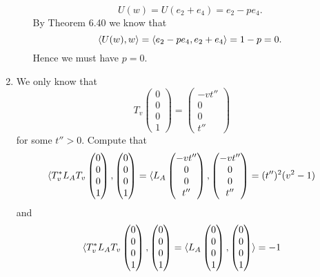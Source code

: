 \begin{enumerate}
\begin{enumerate}
\[U(w)=U(e_2+e_4)=e_2-pe_4.\]
By Theorem 6.40 we know that 
\[\langle U(w),w\rangle =\langle e_2-pe_4,e_2+e_4\rangle =1-p=0.\]
Hence we must have $p=0$.
\end{enumerate}
\item We only know that 
\[T_v\begin{pmatrix}0\\0\\0\\1\end{pmatrix}=\begin{pmatrix}-vt''\\0\\0\\t''\end{pmatrix}\]
for some $t''>0$. Compute that 
\[\langle T_v^*L_AT_v\begin{pmatrix}0\\0\\0\\1\end{pmatrix},\begin{pmatrix}0\\0\\0\\1\end{pmatrix} = \langle L_A\begin{pmatrix}-vt''\\0\\0\\t''\end{pmatrix},\begin{pmatrix}-vt''\\0\\0\\t''\end{pmatrix}=(t'')^2(v^2-1)\]
and 
\[\langle T_v^*L_AT_v\begin{pmatrix}0\\0\\0\\1\end{pmatrix},\begin{pmatrix}0\\0\\0\\1\end{pmatrix} =\langle L_A\begin{pmatrix}0\\0\\0\\1\end{pmatrix},\begin{pmatrix}0\\0\\0\\1\end{pmatrix}\rangle =-1\]

\end{enumerate}
